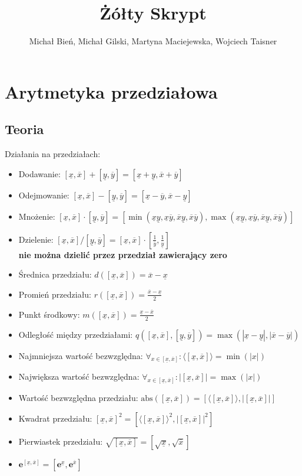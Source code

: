 \documentclass[a4paper]{article}
\author{Michał Bień, Michał Gilski, Martyna Maciejewska, Wojciech Taisner}
\title{Żółty Skrypt}
\begin{document}
\maketitle
\section{Arytmetyka przedziałowa}
\subsection{Teoria}
Działania na przedziałach:
\begin{itemize}
\item Dodawanie: $[\underline{x}, \overline{x}] + [\underline{y}, \overline{y}] = [\underline{x}+\underline{y}, \overline{x}+\overline{y}]$
\item Odejmowanie: $[\underline{x}, \overline{x}] - [\underline{y}, \overline{y}] = [\underline{x}-\overline{y}, \overline{x}-\underline{y}]$
\item Mnożenie: $[\underline{x}, \overline{x}] \cdot [\underline{y}, \overline{y}] = [\min(\underline{x}\underline{y}, \underline{x}\overline{y}, \overline{x}\underline{y}, \overline{x}\overline{y}), \max(\underline{x}\underline{y}, \underline{x}\overline{y}, \overline{x}\underline{y}, \overline{x}\overline{y})] $
\item Dzielenie: $[\underline{x}, \overline{x}]/[\underline{y}, \overline{y}] = [\underline{x}, \overline{x}]\cdot[\frac{1}{\overline{y}},\frac{1}{\underline{y}}]$ \\ \textbf{nie można dzielić przez przedział zawierający zero}
\item Średnica przedziału: $d([\underline{x}, \overline{x}]) = \overline{x} - \underline{x}$
\item Promień przedziału: $r([\underline{x}, \overline{x}]) = \frac{\overline{x} - \underline{x}}{2}$
\item Punkt środkowy: $m([\underline{x}, \overline{x}]) = \frac{\underline{x} - \overline{x}}{2}$
\item Odległość między przedziałami: $q([\underline{x}, \overline{x}], [\underline{y}, \overline{y}]) = \max(|\underline{x}-\underline{y}|, |\overline{x}-\overline{y}|)$
\item Najmniejsza wartość bezwzględna: $\forall_{x \in [\underline{x}, \overline{x}]}: \langle[\underline{x}, \overline{x}]\rangle = \min(|x|)$
\item Największa wartość bezwzględna: $\forall_{x \in [\underline{x}, \overline{x}]}: |[\underline{x}, \overline{x}]| = \max(|x|)$
\item Wartość bezwzględna przedziału: $\text{abs}([\underline{x}, \overline{x}]) = [\langle[\underline{x}, \overline{x}]\rangle, |[\underline{x}, \overline{x}]|]$
\item Kwadrat przedziału: $[\underline{x}, \overline{x}]^2 = [\langle[\underline{x}, \overline{x}]\rangle^2, |[\underline{x}, \overline{x}]|^2]$
\item Pierwiastek przedziału: $\sqrt{[\underline{x}, \overline{x}]} = [\sqrt{\underline{x}}, \sqrt{\overline{x}}]$
\item $\mathbf{e}^{[\underline{x}, \overline{x}]} = [\mathbf{e}^{\underline{x}}, \mathbf{e}^{\overline{x}}]$
\end{itemize}
\end{document}
